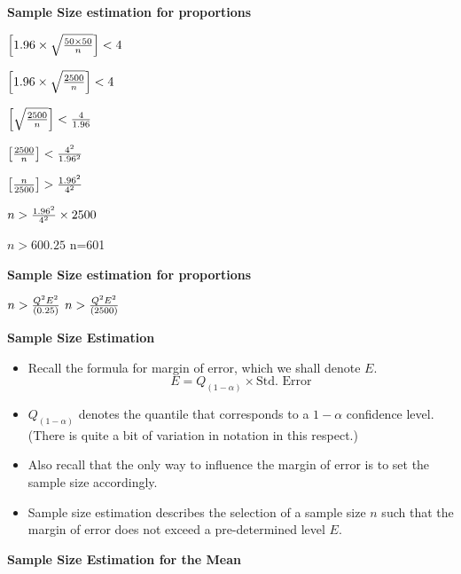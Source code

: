 
\textbf{Sample Size estimation for proportions}

$\left[1.96 \times \sqrt{{ 50 \times 50 \over n}} \right]< 4 $


$\left[1.96 \times \sqrt{{ 2500 \over n}} \right]< 4 $

$\left[ \sqrt{{ 2500 \over n}} \right]< {4 \over 1.96}$

$\left[ { 2500 \over n} \right]< {4^2 \over 1.96^2}$

$\left[ { n \over 2500} \right]> {1.96^2 \over 4^2}$

$n> {1.96^2 \over 4^2} \times 2500$

$n>600.25$ 
n=601



\textbf{Sample Size estimation for proportions}


$n> {Q^2E^2 \over (0.25)}$
$n >{Q^2 E^2 \over (2500)}$




\textbf{Sample Size Estimation}

\begin{itemize} \item Recall the formula for margin of error, which we shall denote $E$.
\[  E = Q_{(1-\alpha)} \times \mbox{Std. Error}\]

\item $Q_{(1-\alpha)}$ denotes the quantile that corresponds to a $1-\alpha$ confidence level. (There is quite a bit of variation in notation in this respect.)
\item Also recall that the only way to influence the margin of error is to set the sample size accordingly.

\item Sample size estimation describes the selection of a sample size $n$ such that the margin of error does not exceed a pre-determined level $E$.
\end{itemize}



\textbf{Sample Size Estimation for the Mean}

